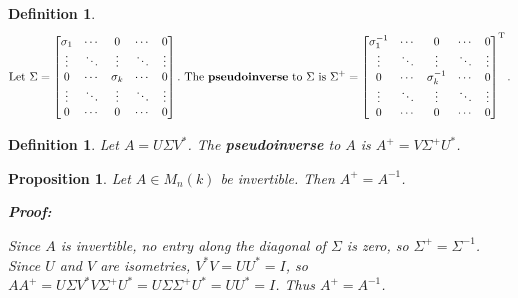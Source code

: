 \documentclass{article}
\theoremstyle{colontheorem}
\newtheorem{proposition}[theorem]{Proposition}
\newtheorem{definition}[theorem]{Definition}
\newenvironment{Proposition}
{
	\begin{mdframed}[backgroundcolor=PropPink!10]
	\begin{proposition}
}
{
	\end{proposition}
	\end{mdframed}
	
	\vspace{.15in}
}
\newenvironment{Def}
{
	\begin{mdframed}[backgroundcolor=DefGreen!10]
	\begin{definition}
}
{
	\end{definition}
	\end{mdframed}
	
	\vspace{.15in}
}
\newenvironment{Proof}
{
	\begin{mdframed}[backgroundcolor=ProofPurple!10]
	\textbf{Proof:}%
}
{
	\end{mdframed}
	
	\vspace{.085in}
}
\begin{document}
\begin{Def}
	
	$$\textnormal{Let}\ \Sigma = \begin{bmatrix}
	
	\sigma_1 & \cdots & 0 & \cdots & 0\\
	\vdots & \ddots & \vdots & \ddots & \vdots\\
	0 & \cdots & \sigma_k & \cdots & 0\\
	\vdots & \ddots & \vdots & \ddots & \vdots\\
	0 & \cdots & 0 & \cdots & 0
	
	\end{bmatrix}.\ \textnormal{The \textbf{pseudoinverse} to}\ \Sigma\ \textnormal{is}\ \Sigma^+ = \begin{bmatrix}
	
	\sigma_1^{-1} & \cdots & 0 & \cdots & 0\\
	\vdots & \ddots & \vdots & \ddots & \vdots\\
	0 & \cdots & \sigma_k^{-1} & \cdots & 0\\
	\vdots & \ddots & \vdots & \ddots & \vdots\\
	0 & \cdots & 0 & \cdots & 0
	
	\end{bmatrix}^\textnormal{T}.
	$$
	
\end{Def}



\begin{Def}
	
	Let $A = U \Sigma V^*$. The \textbf{pseudoinverse} to $A$ is $A^+ = V \Sigma^+ U^*$.
	
\end{Def}



\begin{Proposition}
	
	Let $A \in M_n(k)$ be invertible. Then $A^+ = A^{-1}$.
	
	\begin{Proof}
		Since $A$ is invertible, no entry along the diagonal of $\Sigma$ is zero, so $\Sigma^+ = \Sigma^{-1}$. Since $U$ and $V$ are isometries, $V^* V = U U^* = I$, so $AA^+ = U \Sigma V^* V \Sigma^+ U^* = U \Sigma \Sigma^+ U^* = U U^* = I$. Thus $A^+ = A^{-1}$.
		
	\end{Proof}
	
\end{Proposition}
\end{document}
